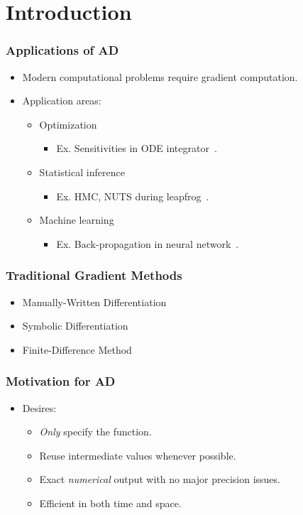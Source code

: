 \section{Introduction}
\frame{\tableofcontents[currentsection]}

\begin{frame}
\frametitle{Applications of AD}
\begin{itemize}
\item Modern computational problems require gradient computation.
\item Application areas:
    \begin{itemize}
        \item Optimization
            \begin{itemize}
                \item Ex. Sensitivities in ODE integrator~\cite{carpenter:2015}.
            \end{itemize}
        \item Statistical inference
            \begin{itemize}
                \item Ex. HMC, NUTS during leapfrog~\cite{hoffman:2011}\cite{neal:2012}.
            \end{itemize}
        \item Machine learning
            \begin{itemize}
                \item Ex. Back-propagation in neural network~\cite{goodfellow:2016}.
            \end{itemize}
    \end{itemize}
\end{itemize}
\end{frame}

\begin{frame}
\frametitle{Traditional Gradient Methods}
\begin{itemize}
\item Manually-Written Differentiation
\item Symbolic Differentiation
\item Finite-Difference Method
\end{itemize}
\end{frame}

\begin{frame}
\frametitle{Motivation for AD}
\begin{itemize}
\item Desires:
    \begin{itemize}
        \item \emph{Only} specify the function.
        \item Reuse intermediate values whenever possible.
        \item Exact \emph{numerical} output with no major precision issues.
        \item Efficient in both time and space.
    \end{itemize}
\end{itemize}
\end{frame}

